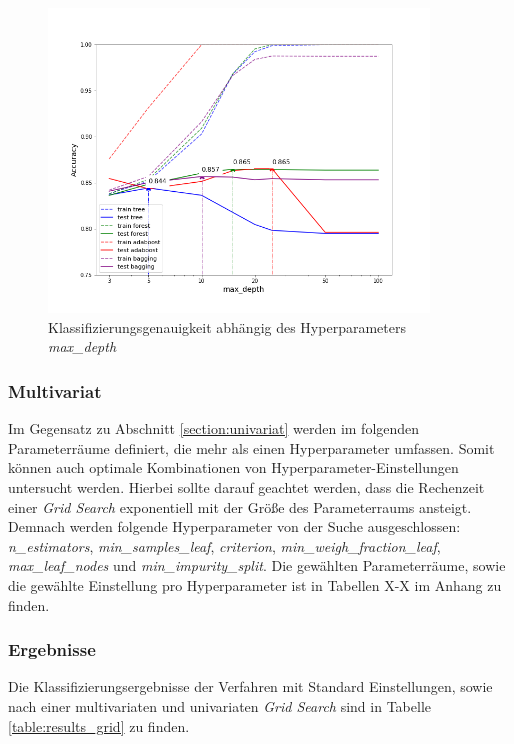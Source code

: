 \begin{figure}[ht]
	\centering
	\includegraphics[width = 0.9\textwidth]{Bilder/grid_search_max_depth.png}
	\caption{Klassifizierungsgenauigkeit abhängig des Hyperparameters \emph{max\_depth}}
	\label{fig:grid_search_max_depth_tree}
\end{figure}

 
\subsubsection{Multivariat}
Im Gegensatz zu Abschnitt \ref{section:univariat} werden im folgenden Parameterräume definiert, die mehr als einen Hyperparameter umfassen. Somit können auch optimale Kombinationen von Hyperparameter-Einstellungen untersucht werden. Hierbei sollte darauf geachtet werden, dass die Rechenzeit einer \emph{Grid Search} exponentiell mit der Größe des Parameterraums ansteigt. Demnach werden folgende Hyperparameter von der Suche ausgeschlossen: \emph{n\_estimators}, \emph{min\_samples\_leaf}, \emph{criterion}, \emph{min\_weigh\_fraction\_leaf}, \emph{max\_leaf\_nodes} und \emph{min\_impurity\_split}. Die gewählten Parameterräume, sowie die gewählte Einstellung pro Hyperparameter ist in Tabellen X-X im Anhang zu finden.

\subsubsection{Ergebnisse}
Die Klassifizierungsergebnisse der Verfahren mit Standard Einstellungen, sowie nach einer multivariaten und univariaten \emph{Grid Search} sind in Tabelle \ref{table:results_grid} zu finden.

